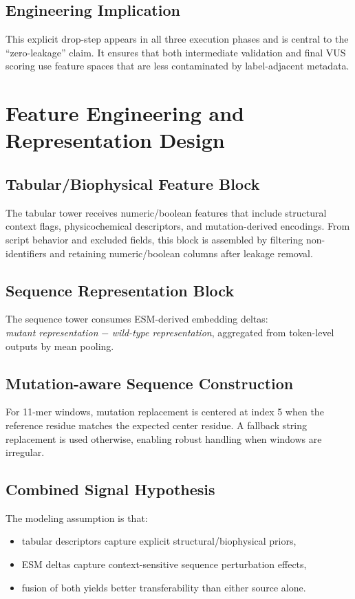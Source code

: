 \documentclass[11pt,a4paper]{article}
\begin{document}
\subsection{Engineering Implication}
This explicit drop-step appears in all three execution phases and is central to the ``zero-leakage'' claim. It ensures that both intermediate validation and final VUS scoring use feature spaces that are less contaminated by label-adjacent metadata.

\section{Feature Engineering and Representation Design}
\subsection{Tabular/Biophysical Feature Block}
The tabular tower receives numeric/boolean features that include structural context flags, physicochemical descriptors, and mutation-derived encodings. From script behavior and excluded fields, this block is assembled by filtering non-identifiers and retaining numeric/boolean columns after leakage removal.

\subsection{Sequence Representation Block}
The sequence tower consumes ESM-derived embedding deltas:\\
\textit{mutant representation} $-$ \textit{wild-type representation}, aggregated from token-level outputs by mean pooling.

\subsection{Mutation-aware Sequence Construction}
For 11-mer windows, mutation replacement is centered at index 5 when the reference residue matches the expected center residue. A fallback string replacement is used otherwise, enabling robust handling when windows are irregular.

\subsection{Combined Signal Hypothesis}
The modeling assumption is that:
\begin{itemize}[leftmargin=1.2cm]
    \item tabular descriptors capture explicit structural/biophysical priors,
    \item ESM deltas capture context-sensitive sequence perturbation effects,
    \item fusion of both yields better transferability than either source alone.
\end{itemize}
\end{document}
